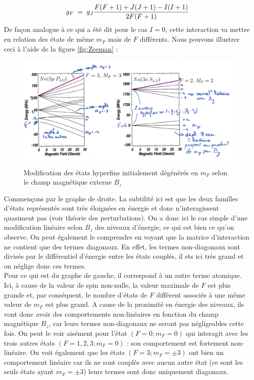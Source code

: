 \[
    g_F \; = \;  g_J \dfrac{F(F+1) + J(J+1) - I(I+1)}{2F(F+1)}
\]
De façon analogue à ce qui a été dit pour le cas $I=0$, cette interaction va mettre en relation des états de même $m_F$ mais de $F$ différents. Nous pouvons illustrer ceci à l'aide de la figure \eqref{fig:Zeeman} :
\begin{figure}[htp]
    \centering
    \includegraphics[width=\textwidth]{Images2/ZeemanHyperfin.PNG}
    \caption{Modification des états hyperfins initialement dégénérés en $m_F$ selon le champ magnétique externe $B_z$}
    \label{fig:Zeeman}
\end{figure}
Commençons par le graphe de droite. La subtilité ici est que les deux familles d'états représentés sont très éloignées en énergie et donc n'interagissent quasiment pas (voir théorie des perturbations). On a donc ici le cas simple d'une modification linéaire selon $B_z$ des niveaux d'énergie, ce qui est bien ce qu'on observe. On peut également le comprendre en voyant que la matrice d'interaction ne contient que des termes diagonaux. En effet, les termes non-diagonaux sont divisés par le différentiel d'énergie entre les états couplés, il ets ici très grand et on néglige donc ces termes.\\

Pour ce qui est du graphe de gauche, il correspond à un autre terme atomique. Ici, à cause de la valeur de spin non-nulle, la valeur maximale de $F$ est plus grande et, par conséquent, le nombre d'états de $F$ différent associés à une même valeur de $m_F$ est plus grand. A cause de la proximité en énergie des niveaux, ils vont donc avoir des comportements non-linéaires en fonction du champ magnétique $B_z$, car leurs termes non-diagonaux ne seront pas négligeables cette fois. On peut le voir aisément pour l'état $(F = 0;m_F = 0)$ qui interagit avec les trois autres états $(F=1,2,3;m_F = 0)$ : son comportement est fortement non-linéaire. On voit également que les états $(F = 3;m_F = \pm3)$ ont bien un comportement linéaire car ils ne sont couplés avec aucun autre état (ce sont les seuls états ayant $m_F=\pm3$) leurs termes sont donc uniquement diagonaux.\\

